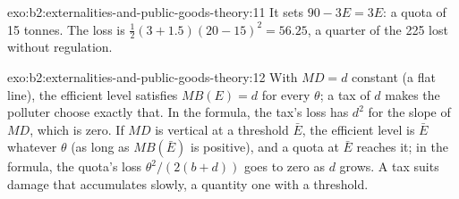 \begin{solution}{exo:b2:externalities-and-public-goods-theory:11}
It sets $90 - 3E = 3E$: a quota of 15 tonnes. The loss is $\tfrac12(3 + 1.5)(20 - 15)^2 = 56.25$, a quarter of the 225 lost without regulation.
\end{solution}

\begin{solution}{exo:b2:externalities-and-public-goods-theory:12}
With $\mathit{MD} = d$ constant (a flat line), the efficient level satisfies $\mathit{MB}(E) = d$ for every $\theta$; a tax of $d$ makes the polluter choose exactly
that. In the formula, the tax's loss has $d^2$ for the slope of $\mathit{MD}$, which is zero. If $\mathit{MD}$ is vertical at a threshold $\bar E$, the efficient level is
$\bar E$ whatever $\theta$ (as long as $\mathit{MB}(\bar E)$ is positive), and a quota at $\bar E$ reaches it; in the formula, the quota's loss $\theta^2/(2(b + d))$ goes to zero as
$d$ grows. A tax suits damage that accumulates slowly, a quantity one with a threshold.
\end{solution}

